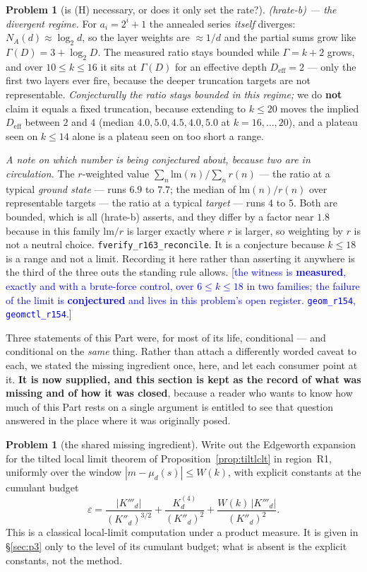 \documentclass[11pt,a4paper]{article}
\theoremstyle{plain}
\theoremstyle{definition}
\newtheorem{problem}[theorem]{Problem}
\theoremstyle{remark}
\newcommand{\STATUS}[1]{\textcolor{blue}{\textsf{[#1]}}}
\begin{document}
\begin{problem}[is \textup{(H)} necessary, or does it only set the rate?]
\emph{\textup{(hrate-b)} --- the divergent regime.} For $a_i=2^{i}+1$ the annealed series
\emph{itself} diverges: $N_A(d)\approx\log_2 d$, so the layer weights are $\approx1/d$ and the
partial sums grow like $\Gamma(D)=3+\log_2 D$. The measured ratio stays bounded while
$\Gamma=k+2$ grows, and over $10\le k\le16$ it sits at $\Gamma(D)$ for an effective depth
$D_{\mathrm{eff}}=2$ --- only the first two layers ever fire, because the deeper truncation
targets are not representable. \emph{Conjecturally the ratio stays bounded in this regime;} we
do \textbf{not} claim it equals a fixed truncation, because extending to $k\le20$ moves the
implied $D_{\mathrm{eff}}$ between $2$ and $4$ (median $4.0,5.0,4.5,4.0,5.0$ at
$k=16,\dots,20$), and a plateau seen on $k\le14$ alone is a plateau seen on too short a range.

\emph{A note on which number is being conjectured about, because two are in circulation.} The
$r$-weighted value $\sum_n\mathrm{lm}(n)/\sum_n r(n)$ --- the ratio at a typical \emph{ground
state} --- runs $6.9$ to $7.7$; the median of $\mathrm{lm}(n)/r(n)$ over representable targets
--- the ratio at a typical \emph{target} --- runs $4$ to $5$. Both are bounded, which is all
\textup{(hrate-b)} asserts, and they differ by a factor near $1.8$ because in this family
$\mathrm{lm}/r$ is larger exactly where $r$ is larger, so weighting by $r$ is not a neutral
choice. \texttt{fverify\_r163\_reconcile}.
\noindent
It is a conjecture because $k\le18$ is a range and not a limit. Recording it here rather than
asserting it anywhere is the third of the three outs the standing rule allows.
\STATUS{the witness is \textbf{measured}, exactly and with a brute-force control, over
$6\le k\le18$ in two families; the failure of the limit is \textbf{conjectured} and lives in this
problem's open register. \texttt{geom\_r154}, \texttt{geomctl\_r154}.}
\end{problem}


Three statements of this Part were, for most of its life, conditional --- and conditional on
the \emph{same} thing. Rather than attach a differently worded caveat to each, we stated the
missing ingredient once, here, and let each consumer point at it. \textbf{It is now supplied,
and this section is kept as the record of what was missing and of how it was closed}, because a
reader who wants to know how much of this Part rests on a single argument is entitled to see
that question answered in the place where it was originally posed.

\begin{problem}[the shared missing ingredient]\label{prob:R1}
Write out the Edgeworth expansion for the tilted local limit theorem of
Proposition~\ref{prop:tiltlclt} in region~\textup{R1}, uniformly over the window
$|m-\mu_d(s)|\le W(k)$, with explicit constants at the cumulant budget
\[
  \varepsilon=\frac{|K'''_d|}{(K''_d)^{3/2}}+\frac{K^{(4)}_d}{(K''_d)^{2}}
     +\frac{W(k)\,|K'''_d|}{(K''_d)^{2}} .
\]
This is a classical local-limit computation under a product measure. It is given
in \S\ref{sec:p3} only to the level of its cumulant budget; what is absent is the
explicit constants, not the method.
\end{problem}
\end{document}
